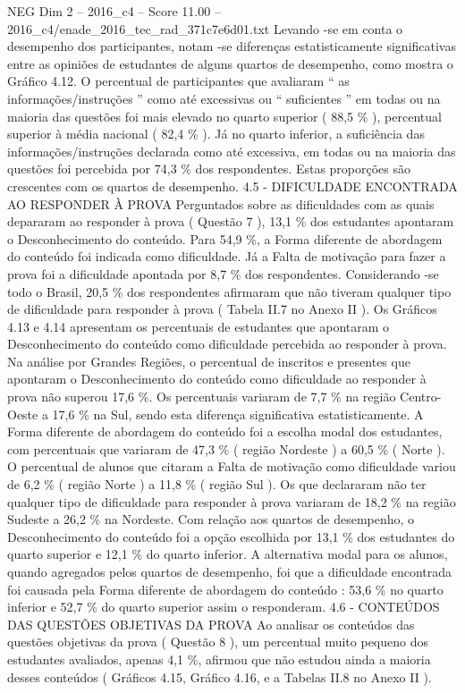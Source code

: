 \begin{textsample}{NEG Dim 2 – 2016\_c4 – Score 11.00 – 2016\_c4/enade\_2016\_tec\_rad\_371c7e6d01.txt}
Levando -se em conta o desempenho dos participantes, notam -se diferenças estatisticamente significativas entre as opiniões de estudantes de alguns quartos de desempenho, como mostra o Gráfico 4.12.
O percentual de participantes que avaliaram “ as informações/instruções ” como até excessivas ou “ suficientes ” em todas ou na maioria das questões foi mais elevado no quarto superior ( 88,5 \% ), percentual superior à média nacional ( 82,4 \% ).
Já no quarto inferior, a suficiência das informações/instruções declarada como até excessiva, em todas ou na maioria das questões foi percebida por 74,3 \% dos respondentes.
Estas proporções são crescentes com os quartos de desempenho. 4.5 - DIFICULDADE ENCONTRADA AO RESPONDER À PROVA Perguntados sobre as dificuldades com as quais depararam ao responder à prova ( Questão 7 ), 13,1 \% dos estudantes apontaram o Desconhecimento do conteúdo.
Para 54,9 \%, a Forma diferente de abordagem do conteúdo foi indicada como dificuldade.
Já a Falta de motivação para fazer a prova foi a dificuldade apontada por 8,7 \% dos respondentes.
Considerando -se todo o Brasil, 20,5 \% dos respondentes afirmaram que não tiveram qualquer tipo de dificuldade para responder à prova ( Tabela II.7 no Anexo II ).
Os Gráficos 4.13 e 4.14 apresentam os percentuais de estudantes que apontaram o Desconhecimento do conteúdo como dificuldade percebida ao responder à prova.
Na análise por Grandes Regiões, o percentual de inscritos e presentes que apontaram o Desconhecimento do conteúdo como dificuldade ao responder à prova não superou 17,6 \%.
Os percentuais variaram de 7,7 \% na região Centro-Oeste a 17,6 \% na Sul, sendo esta diferença significativa estatisticamente.
A Forma diferente de abordagem do conteúdo foi a escolha modal dos estudantes, com percentuais que variaram de 47,3 \% ( região Nordeste ) a 60,5 \% ( Norte ).
O percentual de alunos que citaram a Falta de motivação como dificuldade variou de 6,2 \% ( região Norte ) a 11,8 \% ( região Sul ).
Os que declararam não ter qualquer tipo de dificuldade para responder à prova variaram de 18,2 \% na região Sudeste a 26,2 \% na Nordeste.
Com relação aos quartos de desempenho, o Desconhecimento do conteúdo foi a opção escolhida por 13,1 \% dos estudantes do quarto superior e 12,1 \% do quarto inferior.
A alternativa modal para os alunos, quando agregados pelos quartos de desempenho, foi que a dificuldade encontrada foi causada pela Forma diferente de abordagem do conteúdo : 53,6 \% no quarto inferior e 52,7 \% do quarto superior assim o responderam. 4.6 - CONTEÚDOS DAS QUESTÕES OBJETIVAS DA PROVA Ao analisar os conteúdos das questões objetivas da prova ( Questão 8 ), um percentual muito pequeno dos estudantes avaliados, apenas 4,1 \%, afirmou que não estudou ainda a maioria desses conteúdos ( Gráficos 4.15, Gráfico 4.16, e a Tabelas II.8 no Anexo II ).

\end{textsample}
